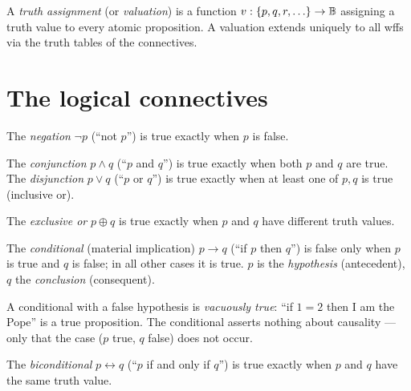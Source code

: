 \begin{definition}
A \emph{truth assignment} (or \emph{valuation}) is a function
$v : \{p, q, r, \ldots\} \to \mathbb{B}$ assigning a truth value to every atomic
proposition. A valuation extends uniquely to all wffs via the truth tables of
the connectives.
\end{definition}

\section{The logical connectives}

\begin{definition}[Negation]
The \emph{negation} $\neg p$ (``not $p$'') is true exactly when $p$ is false.
\end{definition}

\begin{definition}
The \emph{conjunction} $p \wedge q$ (``$p$ and $q$'') is true exactly when both
$p$ and $q$ are true. The \emph{disjunction} $p \vee q$ (``$p$ or $q$'') is
true exactly when at least one of $p, q$ is true (inclusive or).
\end{definition}

\begin{definition}[Exclusive or]
The \emph{exclusive or} $p \oplus q$ is true exactly when $p$ and $q$ have
different truth values.
\end{definition}

\begin{definition}[Conditional]
The \emph{conditional} (material implication) $p \to q$ (``if $p$ then $q$'')
is false only when $p$ is true and $q$ is false; in all other cases it is true.
$p$ is the \emph{hypothesis} (antecedent), $q$ the \emph{conclusion}
(consequent).
\end{definition}

\begin{notebox}
A conditional with a false hypothesis is \emph{vacuously true}: ``if $1 = 2$
then I am the Pope'' is a true proposition. The conditional asserts nothing
about causality --- only that the case ($p$ true, $q$ false) does not occur.
\end{notebox}

\begin{definition}[Biconditional]
The \emph{biconditional} $p \leftrightarrow q$ (``$p$ if and only if $q$'') is
true exactly when $p$ and $q$ have the same truth value.
\end{definition}

